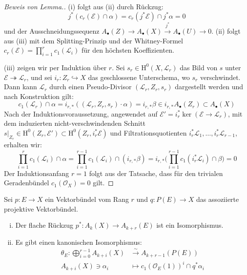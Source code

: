 \documentclass[10pt,a4paper]{article}
\begin{document}
\begin{proof}[Beweis von Lemma.]
(i) folgt aus (ii) durch Rückzug:
\[ j^\ast(c_r(\mathcal{E})\cap\alpha) = c_r(j^\ast\mathcal{E})\cap j^\ast\alpha = 0 \]
und der Ausschneidungssequenz $A_\bullet(Z)\to A_\bullet(X) \stackrel{j^\ast}{\to} A_\bullet(U)\to 0$. (ii) folgt aus (iii) mit dem Splitting-Prinzip und der Whitney-Formel $c_r(\mathcal{E}) = \prod_{i=1}^rc_1(\mathcal{L}_i)$ für den höchsten Koeffizienten.

(iii) zeigen wir per Induktion über $r$. Sei $s_r\in\mathrm{H}^0(X, \mathcal{L}_r)$ das Bild von $s$ unter $\mathcal{E}\twoheadrightarrow\mathcal{L}_r$, und sei $i_r: Z_r\hookrightarrow X$ das geschlossene Unterschema, wo $s_r$ verschwindet. Dann kann $\mathcal{L}_r$ durch einen Pseudo-Divisor $(\mathcal{L}_r,Z_r,s_r)$ dargestellt werden und nach Konstruktion gilt:
\[ c_1(\mathcal{L}_r)\cap \alpha = i_{r,\ast}((\mathcal{L}_r, Z_r, s_r)\cdot\alpha) = i_{r,\ast}\beta \in i_{r,\ast}A_\bullet(Z_r)\subset A_\bullet(X) \]
Nach der Induktionsvoraussetzung, angewendet auf $\mathcal{E}' = i_r^\ast \ker(\mathcal{E}\to\mathcal{L}_r)$, mit dem induzierten nicht-verschwindenden Schnitt $s|_{Z_r}\in\mathrm{H}^0(Z_r,\mathcal{E}')\subset \mathrm{H}^0(Z_r, i_r^\ast\mathcal{E})$ und Filtrationsquotienten $i^\ast_r\mathcal{L}_1,\ldots,i_r^\ast\mathcal{L}_{r-1}$, erhalten wir:
\[ \prod_{i=1}^rc_1(\mathcal{L}_i)\cap\alpha = \prod_{i=1}^{r-1} c_1(\mathcal{L}_i)\cap (i_{r,\ast}\beta) = i_{r,\ast}\Big(\prod_{i=1}^{r-1} c_1(i_r^\ast\mathcal{L}_i)\cap\beta\Big) = 0 \]
Der Induktionsanfang $r=1$ folgt aus der Tatsache, dass für den trivialen Geradenbündel $c_1(\mathcal{O}_X) = 0$ gilt.
\end{proof}

\begin{theorem}
Sei $p:E\to X$ ein Vektorbündel vom Rang $r$ und $q:P(E)\to X$ das assoziierte projektive Vektorbündel.
\begin{enumerate}[(i)]
\item Der flache Rückzug $p^\ast: A_k(X)\to A_{k+r}(E)$ ist ein Isomorphismus.
\item Es gibt einen kanonischen Isomorphismus:
\begin{align*}
\theta_E: \bigoplus_{i=0}^{r-1}A_{k +i}(X) &\stackrel{\sim}{\longrightarrow} A_{k +r-1}(P(E))\\
A_{k+i}(X)\ni \alpha_i &\longmapsto c_1(\mathcal{O}_E(1))^i\cap q^\ast\alpha_i
\end{align*}
\end{enumerate}
\end{theorem}
\end{document}
